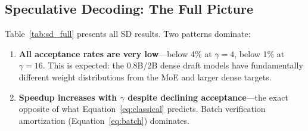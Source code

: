 \documentclass[11pt,a4paper]{article}
\begin{document}
\subsection{Speculative Decoding: The Full Picture}

Table~\ref{tab:sd_full} presents all SD results. Two patterns dominate:

\begin{enumerate}[nosep,leftmargin=*]
  \item \textbf{All acceptance rates are very low}---below 4\% at $\gamma=4$, below 1\% at $\gamma=16$. This is expected: the 0.8B/2B dense draft models have fundamentally different weight distributions from the MoE and larger dense targets.
  \item \textbf{Speedup increases with $\gamma$ despite declining acceptance}---the exact opposite of what Equation~\ref{eq:classical} predicts. Batch verification amortization (Equation~\ref{eq:batch}) dominates.
\end{enumerate}
\end{document}
